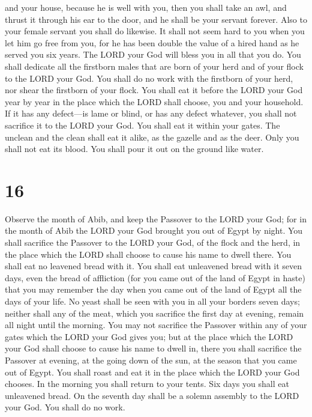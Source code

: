 and your house, because he is well with you,  then you
shall take an awl, and thrust it through his ear to the door, and he
shall be your servant forever. Also to your female servant you shall do
likewise.  It shall not seem hard to you when you let him
go free from you, for he has been double the value of a hired hand as he
served you six years. The LORD your God will bless you in all that you
do.  You shall dedicate all the firstborn males that are
born of your herd and of your flock to the LORD your God. You shall do
no work with the firstborn of your herd, nor shear the firstborn of your
flock.  You shall eat it before the LORD your God year by
year in the place which the LORD shall choose, you and your household.
 If it has any defect---is lame or blind, or has any
defect whatever, you shall not sacrifice it to the LORD your God.
 You shall eat it within your gates. The unclean and the
clean shall eat it alike, as the gazelle and as the deer.
 Only you shall not eat its blood. You shall pour it out
on the ground like water.

\hypertarget{section-15}{%
\section{16}\label{section-15}}

 Observe the month of Abib, and keep the Passover to the
LORD your God; for in the month of Abib the LORD your God brought you
out of Egypt by night.  You shall sacrifice the Passover
to the LORD your God, of the flock and the herd, in the place which the
LORD shall choose to cause his name to dwell there.  You
shall eat no leavened bread with it. You shall eat unleavened bread with
it seven days, even the bread of affliction (for you came out of the
land of Egypt in haste) that you may remember the day when you came out
of the land of Egypt all the days of your life.  No yeast
shall be seen with you in all your borders seven days; neither shall any
of the meat, which you sacrifice the first day at evening, remain all
night until the morning.  You may not sacrifice the
Passover within any of your gates which the LORD your God gives you;
 but at the place which the LORD your God shall choose to
cause his name to dwell in, there you shall sacrifice the Passover at
evening, at the going down of the sun, at the season that you came out
of Egypt.  You shall roast and eat it in the place which
the LORD your God chooses. In the morning you shall return to your
tents.  Six days you shall eat unleavened bread. On the
seventh day shall be a solemn assembly to the LORD your God. You shall
do no work.

